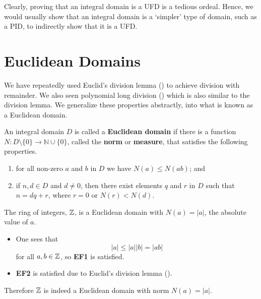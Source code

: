 Clearly, proving that an integral domain is a UFD is a tedious ordeal. Hence, we would usually show that an integral domain is a `simpler' type of domain, such as a PID, to indirectly show that it is a UFD.

\section{Euclidean Domains}
We have repeatedly used Euclid's division lemma () to achieve division with remainder. We also seen polynomial long division () which is also similar to the division lemma. We generalize these properties abstractly, into what is known as a Euclidean domain.

\begin{definition}
    An integral domain $D$ is called a \textbf{Euclidean domain} if there is a function $N: D \setminus \{0\} \to \mathbb{N} \cup \{0\}$, called the \textbf{norm} or \textbf{measure}, that satisfies the following properties.
    \begin{enumerate}[leftmargin=3em,label=\textbf{EF\arabic*}.]
        \item for all non-zero $a$ and $b$ in $D$ we have $N(a) \leq N(ab)$; and
        \item if $n, d \in D$ and $d \neq 0$, then there exist elements $q$ and $r$ in $D$ such that $n = dq + r$, where $r = 0$ or $N(r) < N(d)$.
    \end{enumerate}
\end{definition}

\begin{example}
    The ring of integers, $\mathbb{Z}$, is a Euclidean domain with $N(a) = |a|$, the absolute value of $a$.
    \begin{itemize}
        \item One sees that
        \[
            |a| \leq |a||b| = |ab|
        \]
        for all $a,b\in \mathbb{Z}$, so \textbf{EF1} is satisfied.

        \item \textbf{EF2} is satisfied due to Euclid's division lemma ().
    \end{itemize}
    Therefore $\mathbb{Z}$ is indeed a Euclidean domain with norm $N(a) = |a|$.
\end{example}

